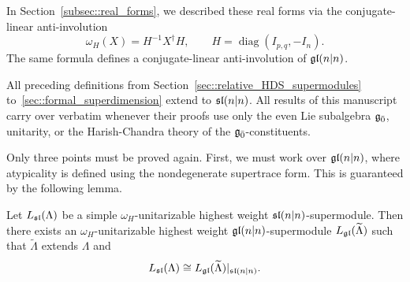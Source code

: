 In Section~\ref{subsec::real_forms}, we described these real forms via the conjugate-linear anti-involution
\begin{equation}\omega_H(X)=H^{-1}X^\dagger H,\qquad H=\operatorname{diag}(I_{p,q},-I_n).\end{equation} 
The same formula defines a conjugate-linear anti-involution of $\gl(n\vert n)$. 




All preceding definitions from Section~\ref{sec::relative_HDS_supermodules} to~\ref{sec::formal_superdimension} extend to $\sl(n\vert n)$. All results of this manuscript carry over verbatim whenever their proofs use only the even Lie subalgebra $\even$, unitarity, or the Harish-Chandra theory of the $\even$-constituents. 

Only three points must be proved again. First, we must work over $\gl(n\vert n)$, where atypicality is defined using the nondegenerate supertrace form. This is guaranteed by the following lemma. 

\begin{lemma}\label{lemm::equal_rank_extension}
Let $L_{\sl}(\Lambda)$ be a simple $\omega_{H}$-unitarizable highest weight
$\sl(n\vert n)$-supermodule. Then there exists an $\omega_{H}$-unitarizable highest
weight $\gl(n\vert n)$-supermodule $L_{\gl}(\widetilde\Lambda)$ such
that $\widetilde\Lambda$ extends $\Lambda$ and
\[
L_{\sl}(\Lambda)
\cong
L_{\gl}(\widetilde\Lambda)\vert_{\sl(n\vert n)}.
\]
\end{lemma}


